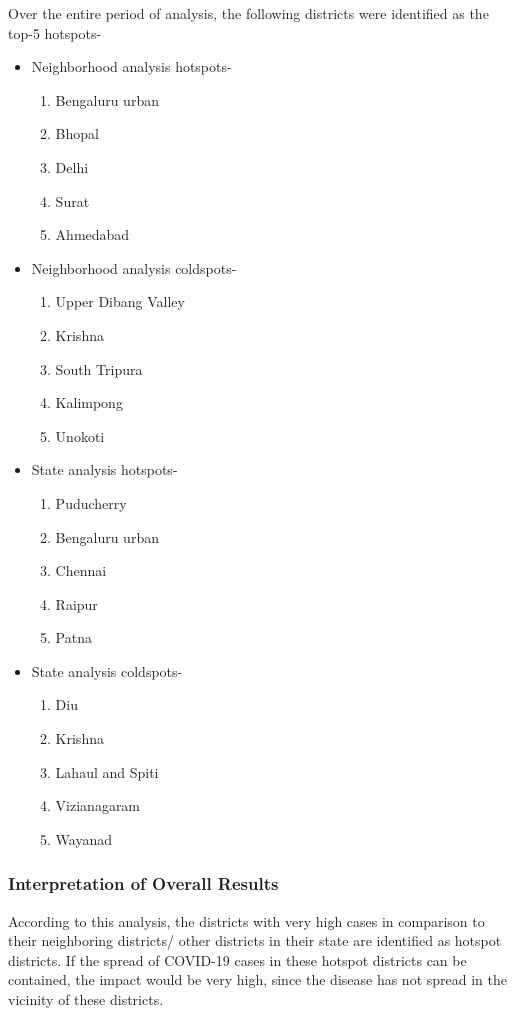 \documentclass{article}
\begin{document}
Over the entire period of analysis, the following districts were identified as the top-5 hotspots-
\begin{itemize}
    \item Neighborhood analysis hotspots-
    \begin{enumerate}
        \item Bengaluru urban
        \item Bhopal
        \item Delhi
        \item Surat
        \item Ahmedabad
    \end{enumerate}
    \item Neighborhood analysis coldspots-
    \begin{enumerate}
        \item Upper Dibang Valley
        \item Krishna
        \item South Tripura
        \item Kalimpong
        \item Unokoti
    \end{enumerate}
    \item State analysis hotspots-
    \begin{enumerate}
        \item Puducherry
        \item Bengaluru urban
        \item Chennai
        \item Raipur
        \item Patna
    \end{enumerate}
    \item State analysis coldspots-
    \begin{enumerate}
        \item Diu
        \item Krishna
        \item Lahaul and Spiti
        \item Vizianagaram
        \item Wayanad
    \end{enumerate}
\end{itemize}

\subsubsection{Interpretation of Overall Results}

According to this analysis, the districts with very high cases in comparison to their neighboring districts/ other districts in their state are identified as hotspot districts. If the spread of COVID-19 cases in these hotspot districts can be contained, the impact would be very high, since the disease has not spread in the vicinity of these districts.
\end{document}
